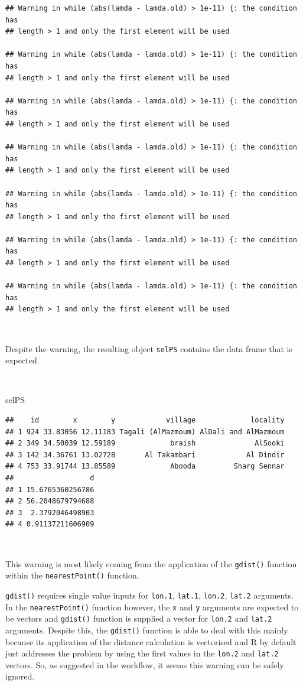 \documentclass[11pt,a4paper]{article}
\newenvironment{Shaded}{}{}
\newcommand{\NormalTok}[1]{#1}
\begin{document}
\begin{verbatim}
## Warning in while (abs(lamda - lamda.old) > 1e-11) {: the condition has
## length > 1 and only the first element will be used

## Warning in while (abs(lamda - lamda.old) > 1e-11) {: the condition has
## length > 1 and only the first element will be used

## Warning in while (abs(lamda - lamda.old) > 1e-11) {: the condition has
## length > 1 and only the first element will be used

## Warning in while (abs(lamda - lamda.old) > 1e-11) {: the condition has
## length > 1 and only the first element will be used

## Warning in while (abs(lamda - lamda.old) > 1e-11) {: the condition has
## length > 1 and only the first element will be used

## Warning in while (abs(lamda - lamda.old) > 1e-11) {: the condition has
## length > 1 and only the first element will be used

## Warning in while (abs(lamda - lamda.old) > 1e-11) {: the condition has
## length > 1 and only the first element will be used
\end{verbatim}

~

Despite the warning, the resulting object \texttt{selPS} contains the
data frame that is expected.

~

\begin{Shaded}
\begin{Highlighting}[]
\NormalTok{selPS}
\end{Highlighting}
\end{Shaded}

\begin{verbatim}
##    id        x        y            village             locality
## 1 924 33.83056 12.11183 Tagali (AlMazmoum) AlDali and AlMazmoum
## 2 349 34.50039 12.59189             braish              AlSooki
## 3 142 34.36761 13.02728       Al Takambari            Al Dindir
## 4 753 33.91744 13.85589             Abooda         Sharg Sennar
##                  d
## 1 15.6765360256786
## 2 56.2048679794688
## 3  2.3792046498903
## 4 0.91137211606909
\end{verbatim}

~

This warning is most likely coming from the application of the
\texttt{gdist()} function within the \texttt{nearestPoint()} function.

\texttt{gdist()} requires single value inputs for \texttt{lon.1},
\texttt{lat.1}, \texttt{lon.2}, \texttt{lat.2} arguments. In the
\texttt{nearestPoint()} function however, the \texttt{x} and \texttt{y}
arguments are expected to be vectors and \texttt{gdist()} function is
supplied a vector for \texttt{lon.2} and \texttt{lat.2} arguments.
Despite this, the \texttt{gdist()} function is able to deal with this
mainly because its application of the distance calculation is vectorised
and R by default just addresses the problem by using the first values in
the \texttt{lon.2} and \texttt{lat.2} vectors. So, as suggested in the
workflow, it seems this warning can be safely ignored.
\end{document}
